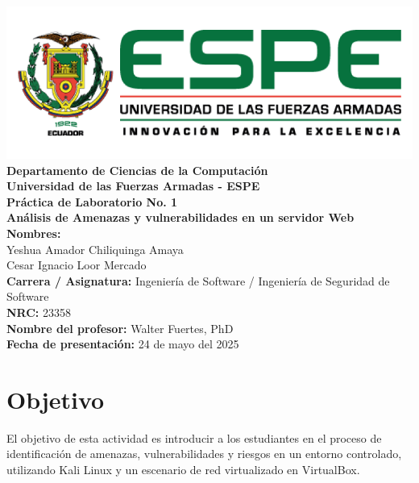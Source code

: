\documentclass[12pt,a4paper]{article}
\begin{document}
\begin{titlepage}
    \centering
    \vspace*{1cm}
    \includegraphics[width=0.8\linewidth]{espe.png}\\[0.5cm]
    
    \Large \textbf{Departamento de Ciencias de la Computación}\\
    \large \textbf{Universidad de las Fuerzas Armadas - ESPE}\\[0.5cm]
    
    \Huge \textbf{Práctica de Laboratorio No. 1}\\[0.3cm]
    \Large \textbf{Análisis de Amenazas y vulnerabilidades en un servidor Web}\\[0.8cm]
    
    \textbf{Nombres:}\\
    Yeshua Amador Chiliquinga Amaya\\
    Cesar Ignacio Loor Mercado\\[0.3cm]
    
    \textbf{Carrera / Asignatura:} Ingeniería de Software / Ingeniería de Seguridad de Software\\
    \textbf{NRC:} 23358\\
    \textbf{Nombre del profesor:} Walter Fuertes, PhD\\[0.5cm]
    
    \textbf{Fecha de presentación:} 24 de mayo del 2025\\[1cm]    
    \vfill
\end{titlepage}

\tableofcontents
\newpage

\section{Objetivo}
El objetivo de esta actividad es introducir a los estudiantes en el proceso de identificación de amenazas, vulnerabilidades y riesgos en un entorno controlado, utilizando Kali Linux y un escenario de red virtualizado en VirtualBox.
\end{document}
